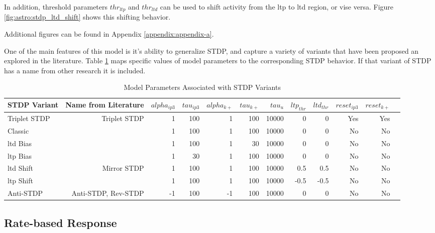 
In addition, threshold parameters $thr_{ltp}$ and $thr_{ltd}$ can be used to
shift activity from the \Gls{ltp} to \Gls{ltd} region, or vise versa. Figure
\ref{fig:astro:stdp_ltd_shift} shows this shifting behavior.


Additional figures can be found in Appendix \ref{appendix:appendix-a}.

One of the main features of this model is it's ability to generalize STDP,
and capture a variety of variants that have been proposed an explored in the
literature. Table \ref{table:astro_varient_params} maps specific values of
model parameters to the corresponding STDP behavior. If that
variant of STDP has a name from other research it is included.

\begin{table}[!htp]\centering
\caption{Model Parameters Associated with STDP Variants} \label{table:astro_varient_params}
\scriptsize
\begin{tabular}{lrrrrrrrrrrr}\toprule
STDP Variant &Name from Literature &$alpha_{ip3}$ &$tau_{ip3}$ &$alpha_{k+}$ &$tau_{k+}$ &$tau_u$ &$ltp_{thr}$ &$ltd_{thr}$ &$reset_{ip3}$ &$reset_{k+}$ \\\midrule
Triplet STDP &Triplet STDP &1 &100 &1 &100 &10000 &0 &0 &Yes &Yes \\
Classic & &1 &100 &1 &100 &10000 &0 &0 &No &No \\
\Gls{ltd} Bias & &1 &100 &1 &30 &10000 &0 &0 &No &No \\
\Gls{ltp} Bias & &1 &30 &1 &100 &10000 &0 &0 &No &No \\
\Gls{ltd} Shift &Mirror STDP &1 &100 &1 &100 &10000 &0.5 &0.5 &No &No \\
\Gls{ltp} Shift & &1 &100 &1 &100 &10000 &-0.5 &-0.5 &No &No \\
Anti-STDP &Anti-STDP, Rev-STDP &-1 &100 &-1 &100 &10000 &0 &0 &No &No \\
\bottomrule
\end{tabular}
\end{table}

\subsection{Rate-based Response} \label{sec:rate_response}

